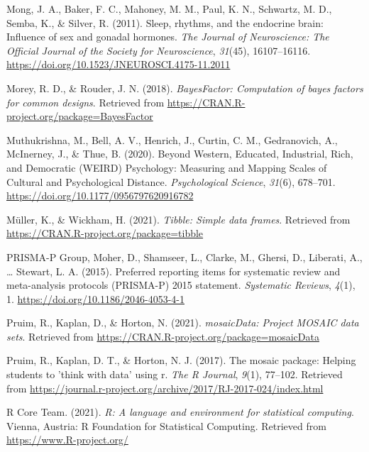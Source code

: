 \documentclass[
  english,
  jou,floatsintext]{apa6}
\newlength{\cslhangindent}
\newenvironment{CSLReferences}[2] %
 {%
  \setlength{\parindent}{0pt}
  \ifodd #1 \everypar{\setlength{\hangindent}{\cslhangindent}}\ignorespaces\fi
  \ifnum #2 > 0
  \setlength{\parskip}{#2\baselineskip}
  \fi
 }%
 {}
\begin{document}
\begin{CSLReferences}{1}{0}
\leavevmode{}%
Mong, J. A., Baker, F. C., Mahoney, M. M., Paul, K. N., Schwartz, M. D., Semba, K., \& Silver, R. (2011). Sleep, rhythms, and the endocrine brain: Influence of sex and gonadal hormones. \emph{The Journal of Neuroscience: The Official Journal of the Society for Neuroscience}, \emph{31}(45), 16107--16116. \url{https://doi.org/10.1523/JNEUROSCI.4175-11.2011}

\leavevmode{}%
Morey, R. D., \& Rouder, J. N. (2018). \emph{BayesFactor: Computation of bayes factors for common designs}. Retrieved from \url{https://CRAN.R-project.org/package=BayesFactor}

\leavevmode{}%
Muthukrishna, M., Bell, A. V., Henrich, J., Curtin, C. M., Gedranovich, A., McInerney, J., \& Thue, B. (2020). Beyond {Western}, {Educated}, {Industrial}, {Rich}, and {Democratic} ({WEIRD}) {Psychology}: {Measuring} and {Mapping} {Scales} of {Cultural} and {Psychological} {Distance}. \emph{Psychological Science}, \emph{31}(6), 678--701. \url{https://doi.org/10.1177/0956797620916782}

\leavevmode{}%
Müller, K., \& Wickham, H. (2021). \emph{Tibble: Simple data frames}. Retrieved from \url{https://CRAN.R-project.org/package=tibble}

\leavevmode{}%
PRISMA-P Group, Moher, D., Shamseer, L., Clarke, M., Ghersi, D., Liberati, A., \ldots{} Stewart, L. A. (2015). Preferred reporting items for systematic review and meta-analysis protocols ({PRISMA}-{P}) 2015 statement. \emph{Systematic Reviews}, \emph{4}(1), 1. \url{https://doi.org/10.1186/2046-4053-4-1}

\leavevmode{}%
Pruim, R., Kaplan, D., \& Horton, N. (2021). \emph{mosaicData: Project MOSAIC data sets}. Retrieved from \url{https://CRAN.R-project.org/package=mosaicData}

\leavevmode{}%
Pruim, R., Kaplan, D. T., \& Horton, N. J. (2017). The mosaic package: Helping students to 'think with data' using r. \emph{The R Journal}, \emph{9}(1), 77--102. Retrieved from \url{https://journal.r-project.org/archive/2017/RJ-2017-024/index.html}

\leavevmode{}%
R Core Team. (2021). \emph{R: A language and environment for statistical computing}. Vienna, Austria: R Foundation for Statistical Computing. Retrieved from \url{https://www.R-project.org/}


\end{CSLReferences}
\end{document}
